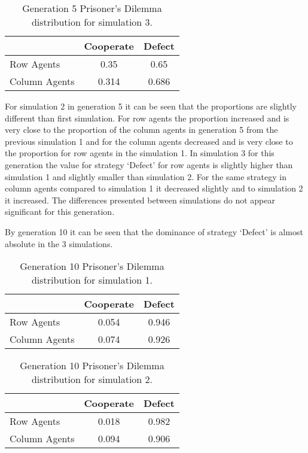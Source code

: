 \begin{table}[H]
\begin{center}
\begin{tabular}{|l|c|c|}
\hline
& Cooperate & Defect \\ 
\hline
Row Agents & 0.35 & 0.65\\
\hline
Column Agents & 0.314 & 0.686\\
\hline
\end{tabular}
\end{center}
\caption{Generation 5 Prisoner’s Dilemma distribution for simulation 3.}
\label{tab:pds3g5}
\end{table}
For simulation 2 in generation 5 it can be seen that the proportions are slightly different than first simulation. For row agents the proportion increased and is very close to the proportion of the column agents in generation 5 from the previous simulation 1 and for the column agents decreased and is very close to the proportion for row agents in the simulation 1.
In simulation 3 for this generation the value for strategy `Defect' for row agents is slightly higher than simulation 1 and slightly smaller than simulation 2. For the same strategy in column agents compared to simulation 1 it decreased slightly and to simulation 2 it increased. The differences presented between simulations do not appear significant for this generation.

By generation 10 it can be seen that the dominance of strategy `Defect'  is almost absolute in the 3 simulations.
\begin{table}[H]
\begin{center}
\begin{tabular}{|l|c|c|}
\hline
& Cooperate & Defect \\ 
\hline
Row Agents & 0.054 & 0.946\\
\hline
Column Agents & 0.074 & 0.926\\
\hline
\end{tabular}
\end{center}
\caption{Generation 10 Prisoner’s Dilemma distribution for simulation 1.}
\label{tab:pds1g10}
\end{table}

\begin{table}[H]
\begin{center}
\begin{tabular}{|l|c|c|}
\hline
& Cooperate & Defect \\ 
\hline
Row Agents & 0.018 & 0.982\\
\hline
Column Agents & 0.094 & 0.906\\
\hline
\end{tabular}
\end{center}
\caption{Generation 10 Prisoner’s Dilemma distribution for simulation 2.}
\label{tab:pds2g10}
\end{table}

